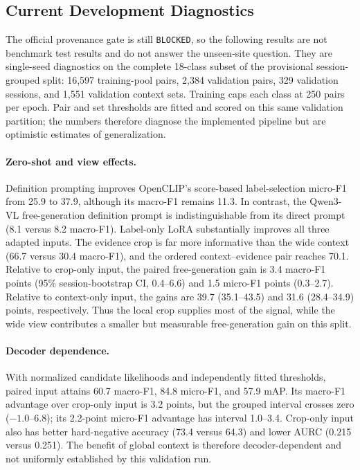 \subsection{Current Development Diagnostics}
\label{sec:development_results}

The official provenance gate is still \texttt{BLOCKED}, so the following results are not benchmark test results and do not answer the unseen-site question. They are single-seed diagnostics on the complete 18-class subset of the provisional session-grouped split: 16,597 training-pool pairs, 2,384 validation pairs, 329 validation sessions, and 1,551 validation context sets. Training caps each class at 250 pairs per epoch. Pair and set thresholds are fitted and scored on this same validation partition; the numbers therefore diagnose the implemented pipeline but are optimistic estimates of generalization.



\paragraph{Zero-shot and view effects.}
Definition prompting improves OpenCLIP's score-based label-selection micro-F1 from 25.9 to 37.9, although its macro-F1 remains 11.3. In contrast, the Qwen3-VL free-generation definition prompt is indistinguishable from its direct prompt (8.1 versus 8.2 macro-F1). Label-only LoRA substantially improves all three adapted inputs. The evidence crop is far more informative than the wide context (66.7 versus 30.4 macro-F1), and the ordered context--evidence pair reaches 70.1. Relative to crop-only input, the paired free-generation gain is 3.4 macro-F1 points (95\% session-bootstrap CI, 0.4--6.6) and 1.5 micro-F1 points (0.3--2.7). Relative to context-only input, the gains are 39.7 (35.1--43.5) and 31.6 (28.4--34.9) points, respectively. Thus the local crop supplies most of the signal, while the wide view contributes a smaller but measurable free-generation gain on this split.



\paragraph{Decoder dependence.}
With normalized candidate likelihoods and independently fitted thresholds, paired input attains 60.7 macro-F1, 84.8 micro-F1, and 57.9 mAP. Its macro-F1 advantage over crop-only input is 3.2 points, but the grouped interval crosses zero ($-1.0$--6.8); its 2.2-point micro-F1 advantage has interval 1.0--3.4. Crop-only input also has better hard-negative accuracy (73.4 versus 64.3) and lower AURC (0.215 versus 0.251). The benefit of global context is therefore decoder-dependent and not uniformly established by this validation run.

